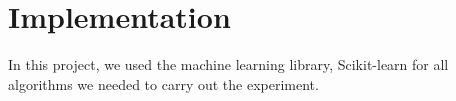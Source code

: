 \chapter{Implementation}
In this project, we used the machine learning library, Scikit-learn for all algorithms we needed to carry out the experiment. 

